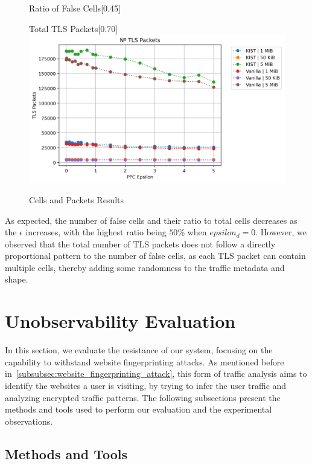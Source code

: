 \begin{figure}[htbp]
\begin{subcaptionbox}{Ratio of False Cells\label{fig:local_dummy_ratio}}[0.45\textwidth]
    \end{subcaptionbox}
    \vfill
    \begin{subcaptionbox}{Total TLS Packets\label{fig:local_packet_count}}[0.70\textwidth]
        {\includegraphics[width=\linewidth]{Chapters/Figures/Plots/local_packet_count_5mib.png}}
    \end{subcaptionbox}
    \caption{Cells and Packets Results}\label{fig:cell_packets_results}
\end{figure}

As expected, the number of false cells and their ratio to total cells decreases as the $\epsilon$ increases, with the highest ratio being $50\%$ when $epsilon_d = 0$. However, we observed that the total number of TLS packets does not follow a directly proportional pattern to the number of false cells, as each TLS packet can contain multiple cells, thereby adding some randomness to the traffic metadata and shape. 

\section{Unobservability Evaluation}\label{sec:unobservability_evaluation}

In this section, we evaluate the resistance of our system, focusing on the capability to withstand website fingerprinting attacks. As mentioned before in~\autoref{subsubsec:website_fingerprinting_attack}, this form of traffic analysis aims to identify the websites a user is visiting, by trying to infer the user traffic and analyzing encrypted traffic patterns.
The following subsections present the methods and tools used to perform our evaluation and the experimental observations.  

\subsection{Methods and Tools}\label{subsec:methods_and_tools}

